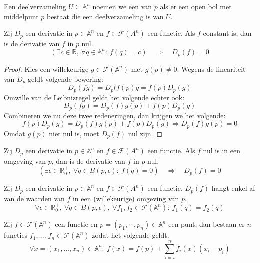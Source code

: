 \documentclass[main.tex]{subfiles}
\begin{document}
\begin{de}
  Een deelverzameling $U \subseteq \mathbb{A}^{n}$ noemen we een  van $p$ als er een open bol met middelpunt $p$ bestaat die een deelverzameling is van $U$.
\end{de}

\begin{lem}
  Zij $D_{p}$ een derivatie in $p\in\mathbb{A}^{n}$ en $f\in\mathcal{F}(A^{n})$ een functie.
  Als $f$ constant is, dan is de derivatie van $f$ in $p$ nul.
  \[ (\exists c\in\mathbb{R},\ \forall q\in\mathbb{A}^{n}:\ f(q) = c) \quad\Rightarrow\quad D_{p}(f) = 0 \]

  \begin{proof}
    Kies een willekeurige $g\in \mathcal{F}(\mathbb{A}^{n})$ met $g(p) \neq 0$.
    Wegens de lineariteit van $D_{p}$ geldt volgende bewering:
    \[ D_{p}(fg) = D_{p}(f(p)g = f(p)D_{p}(g) \]
    Omwille van de Leibnizregel geldt het volgende echter ook:
    \[ D_{p}(fg) = D_{p}(f)g(p) + f(p)D_{p}(g) \]
    Combineren we nu deze twee redeneringen, dan krijgen we het volgende:
    \[ f(p)D_{p}(g) = D_{p}(f)g(p) + f(p)D_{p}(g) \Rightarrow D_{p}(f)g(p) = 0 \]
    Omdat $g(p)$ niet nul is, moet $D_{p}(f)$ nul zijn.
  \end{proof}
\end{lem}

\begin{lem}
  Zij $D_{p}$ een derivatie in $p\in\mathbb{A}^{n}$ en $f\in\mathcal{F}(A^{n})$ een functie.
  Als $f$ nul is in een omgeving van $p$, dan is de derivatie van $f$ in $p$ nul.
  \[ (\exists \epsilon\in\mathbb{R}^{+}_{0},\ \forall q \in B(p,\epsilon):\ f(q) = 0) \quad\Rightarrow\quad D_{p}(f) = 0 \]

\end{lem}

\begin{lem}
  Zij $D_{p}$ een derivatie in $p\in\mathbb{A}^{n}$ en $f\in\mathcal{F}(A^{n})$ een functie.
  $D_{p}(f)$ hangt enkel af van de waarden van $f$ in een (willekeurige) omgeving van $p$.
  \[ \forall \epsilon\in\mathbb{R}^{+}_{0},\ \forall q \in B(p,\epsilon),\ \forall f_{1},f_{2}\in\mathcal{F}(\mathbb{A}^{n}):\ f_{1}(q) = f_{2}(q) \]
\end{lem}

\begin{lem}
  Zij $f \in \mathcal{F}(\mathbb{A}^{n})$ een functie en $p = (p_{1},\dotsb,p_{n}) \in \mathbb{A}^{n}$ een punt, dan bestaan er $n$ functies $f_{1},\dotsc,f_{n} \in \mathcal{F}(\mathbb{A}^{n})$ zodat het volgende geldt.
  \[
  \forall x = (x_{1},\dotsc,x_{n})\in\mathbb{A}^{n}:\ f(x) = f(p) + \sum_{i=i}^{n}f_{i}(x)(x_{i}-p_{i})
  \]
\end{lem}
\end{document}
